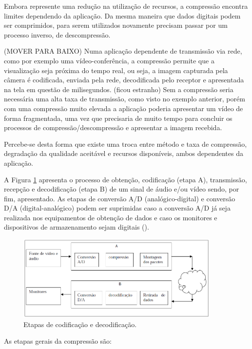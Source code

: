 Embora represente uma redução na utilização de recursos, a compressão encontra limites dependendo da aplicação. Da mesma maneira que dados digitais podem ser comprimidos, para serem utilizados novamente precisam passar por um processo inverso, de descompressão.

(MOVER PARA BAIXO) Numa aplicação dependente de transmissão via rede, como por exemplo uma vídeo-conferência, a compressão permite que a visualização seja próxima do tempo real, ou seja, a imagem capturada pela câmera é codificada, enviada pela rede, decodificada pelo receptor e apresentada na tela em questão de milisegundos. (ficou estranho) Sem a compressão seria necessária uma alta taxa de transmissão, como visto no exemplo anterior, porém com uma compressão muito elevada a aplicação poderia apresentar um vídeo de forma fragmentada, uma vez que precisaria de muito tempo para concluir os processos de compressão/descompressão e apresentar a imagem recebida.

Percebe-se desta forma que existe uma troca entre método e taxa de compressão, degradação da qualidade aceitável e recursos disponíveis, ambos dependentes da aplicação.

A Figura \ref{fig:codingprocess} apresenta o processo de obtenção, codificação (etapa A), transmissão, recepção e decodificação (etapa B) de um sinal de áudio e/ou vídeo sendo, por fim, apresentado. As etapas de conversão A/D (analógico-digital) e conversão D/A (digital-analógico) podem ser suprimidas caso a conversão A/D já seja realizada nos equipamentos de obtenção de dados e caso os monitores e dispositivos de armazenamento sejam digitais (\cite{rehme}).

\begin{figure}[!htb]
	\centering
	\includegraphics[width=0.9\textwidth]{./imgs/codingprocess.png}
	\caption{Etapas de codificação e decodificação.}
	\label{fig:codingprocess}
\end{figure}

As etapas gerais da compressão são:

